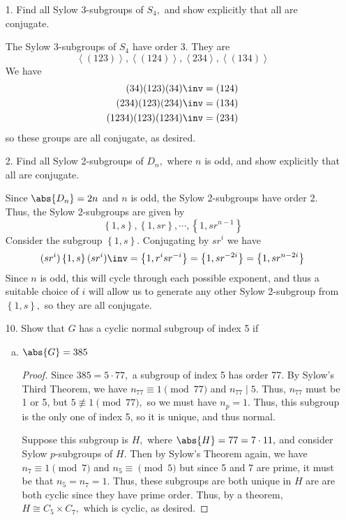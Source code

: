 \documentclass{article}
\begin{document}
\begin{itemize}
	\item[1.] Find all Sylow 3-subgroups of $S_4,$ and show explicitly that all are conjugate.
		\begin{soln}
			The Sylow 3-subgroups of $S_4$ have order 3. They are \[\left< (123)\right>, \left< (124)\right>, \left< 234\right>, \left< (134)\right>\]
			We have 
			\begin{align*}
				(34)(123)(34)\inv &= (124) \\
				(234)(123)(234)\inv &= (134) \\
				(1234)(123)(1234)\inv &= (234)
			\end{align*}
			so these groups are all conjugate, as desired.
			
		\end{soln}

		\newpage
	\item[2.] Find all Sylow 2-subgroups of $D_n,$ where $n$ is odd, and show explicitly that all are conjugate.
		\begin{soln}
			Since $\abs{D_n}=2n$ and $n$ is odd, the Sylow 2-subgroups have order 2. Thus, the Sylow 2-subgroups are given by \[\left\{ 1, s \right\}, \left\{ 1, sr \right\}, \cdots, \left\{ 1, sr^{n-1} \right\}\] Consider the subgroup $\left\{ 1, s \right\}.$ Conjugating by $sr^i$ we have \[(sr^i)\left\{ 1, s \right\}(sr^i)\inv = \left\{ 1, r^isr^{-i} \right\}=\left\{ 1, sr^{-2i} \right\} = \left\{ 1, sr^{n-2i} \right\}\] Since $n$ is odd, this will cycle through each possible exponent, and thus a suitable choice of $i$ will allow us to generate any other Sylow 2-subgroup from $\left\{ 1, s \right\},$ so they are all conjugate.
			
		\end{soln}

	\item[10.] Show that $G$ has a cyclic normal subgroup of index 5 if
		\begin{enumerate}[(a)]
			\item $\abs{G}=385$
				\begin{proof}
					Since $385=5\cdot77,$ a subgroup of index 5 has order 77. By Sylow's Third Theorem, we have $n_{77}\equiv 1\pmod{77}$ and $n_{77}\mid 5.$ Thus, $n_{77}$ must be 1 or 5, but $5\not\equiv 1\pmod{77},$ so we must have $n_p=1.$ Thus, this subgroup is the only one of index 5, so it is unique, and thus normal.

					Suppose this subgroup is $H,$ where $\abs{H}=77=7\cdot 11,$ and consider Sylow $p$-subgroups of $H.$ Then by Sylow's Theorem again, we have $n_7\equiv1\pmod 7$ and $n_5\equiv\pmod 5$ but since 5 and 7 are prime, it must be that $n_5=n_7=1.$ Thus, these subgroups are both unique in $H$ are are both cyclic since they have prime order. Thus, by a theorem, $H\cong C_5\times C_7,$ which is cyclic, as desired.
					

\end{proof}
\end{enumerate}
\end{itemize}
\end{document}
